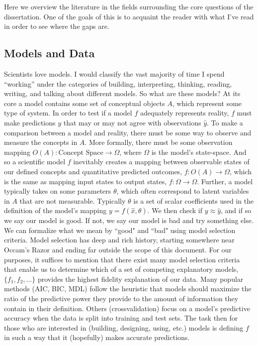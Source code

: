 \documentclass[]{article}
\begin{document}
Here we overview the literature in the fields surrounding the core questions of the dissertation. One of the goals of this is to acquaint the reader with what I've read in order to see where the gaps are.

\hypertarget{models-and-data}{%
\subsection{Models and Data}\label{models-and-data}}

Scientists love models. I would classify the vast majority of time I
spend ``working'' under the categories of building, interpreting,
thinking, reading, writing, and talking about different models. So
what are these models? At its core a model contains some set of
conceptual objects \(A\), which represent some type of system. In order to test
if a model \(f\) adequately represents reality, \(f\) must make
predictions \(y\) that may or may not agree with observations
\(\hat{y}\). To make a comparison between a model and reality, there
must be some way to observe and measure the concepts in \(A\). More
formally, there must be some observation mapping
\(O(A) : \text{Concept Space} \to \Omega\), where $\Omega$ is the model's state-space. And so a scientific model \(f\) inevitably creates a
mapping between observable states of our defined concepts and
quantitative predicted outcomes, \(f : O(A) \to \Omega\), which is the same as mapping input states to output states, $f : \Omega \to \Omega$. Further, a model typically
takes on some parameters \(\theta\), which often correspond to
latent variables in \(A\) that are not measurable. Typically \(\theta\) is a set of scalar
coefficients used in the definition of the model's mapping
\(y = f(\hat{x}, \theta)\). We then check if \(y \approx \hat{y}\), and if so we say our model is
good. If not, we say our model is bad and try something else. We can formalize what we mean by ``good" and ``bad" using
model selection criteria. Model selection has deep and rich history,
starting somewhere near Occam's Razor and ending far outside the
scope of this document. For our purposes, it suffices to mention that
there exist many model selection criteria that enable us to determine
which of a set of competing explanatory models, \(\{f_1, f_2, \dots\}\)
provides the highest fidelity explanation of our data. Many popular
methods (AIC, BIC, MDL) follow the heuristic that models should maximize
the ratio of the predictive power they provide to the amount of
information they contain in their definition. Others (crossvalidation)
focus on a model's predictive accuracy when the data is split into
training and test sets. The task then for those who are interested in (building,
designing, using, etc.) models is defining \(f\) in such a way that it
(hopefully) makes accurate predictions.
\end{document}
